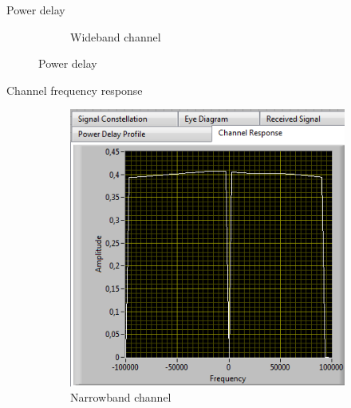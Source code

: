 \documentclass{beamer}
\begin{document}
\begin{frame}{Power delay}
\begin{figure}[h!]
\begin{subfigure}[b]{0.45 \textwidth}
                        \caption{Wideband channel}\label{fig:4}
                    \end{subfigure}
                    \caption{Power delay}\label{fig:const}
                \end{figure}
\end{frame}


\begin{frame}{Channel frequency response}
                \begin{figure}[h!]
                    \centering
                    \begin{subfigure}[b]{0.45 \textwidth}
                        \includegraphics[width=\textwidth]{narrowRep.PNG}
                        \caption{Narrowband channel}\label{fig:2}
                    \end{subfigure}
                    ~
                    \begin{subfigure}[b]{0.45 \textwidth}

\end{subfigure}
\end{figure}
\end{frame}
\end{document}
